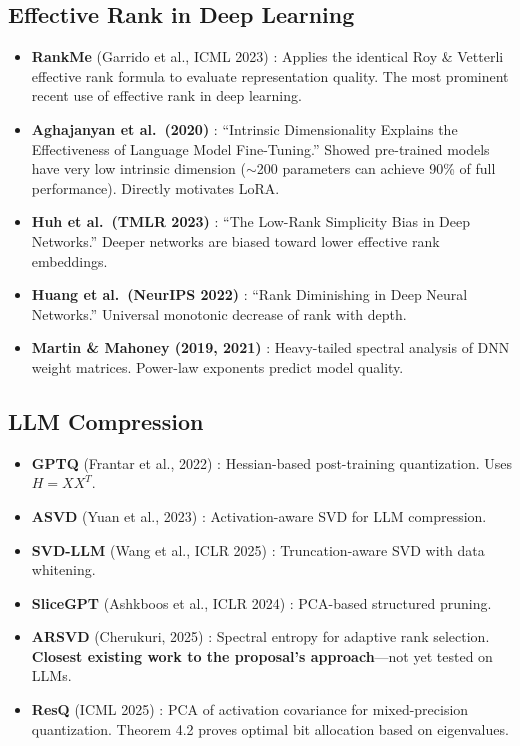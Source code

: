 \documentclass[11pt,a4paper]{article}
\begin{document}
\subsection{Effective Rank in Deep Learning}
\begin{itemize}
    \item \textbf{RankMe} (Garrido et al., ICML 2023) \cite{garrido2023rankme}: Applies the identical Roy \& Vetterli effective rank formula to evaluate representation quality. The most prominent recent use of effective rank in deep learning.
    \item \textbf{Aghajanyan et al.\ (2020)} \cite{aghajanyan2020intrinsic}: ``Intrinsic Dimensionality Explains the Effectiveness of Language Model Fine-Tuning.'' Showed pre-trained models have very low intrinsic dimension ($\sim$200 parameters can achieve 90\% of full performance). Directly motivates LoRA.
    \item \textbf{Huh et al.\ (TMLR 2023)} \cite{huh2023lowrank}: ``The Low-Rank Simplicity Bias in Deep Networks.'' Deeper networks are biased toward lower effective rank embeddings.
    \item \textbf{Huang et al.\ (NeurIPS 2022)} \cite{huang2022rank}: ``Rank Diminishing in Deep Neural Networks.'' Universal monotonic decrease of rank with depth.
    \item \textbf{Martin \& Mahoney (2019, 2021)} \cite{martin2019traditional, martin2021predicting}: Heavy-tailed spectral analysis of DNN weight matrices. Power-law exponents predict model quality.
\end{itemize}

\subsection{LLM Compression}
\begin{itemize}
    \item \textbf{GPTQ} (Frantar et al., 2022) \cite{frantar2022gptq}: Hessian-based post-training quantization. Uses $H = XX^T$.
    \item \textbf{ASVD} (Yuan et al., 2023) \cite{yuan2023asvd}: Activation-aware SVD for LLM compression.
    \item \textbf{SVD-LLM} (Wang et al., ICLR 2025) \cite{wang2024svdllm}: Truncation-aware SVD with data whitening.
    \item \textbf{SliceGPT} (Ashkboos et al., ICLR 2024) \cite{ashkboos2024slicegpt}: PCA-based structured pruning.
    \item \textbf{ARSVD} (Cherukuri, 2025) \cite{cherukuri2025arsvd}: Spectral entropy for adaptive rank selection. \textbf{Closest existing work to the proposal's approach}---not yet tested on LLMs.
    \item \textbf{ResQ} (ICML 2025) \cite{resq2025}: PCA of activation covariance for mixed-precision quantization. Theorem 4.2 proves optimal bit allocation based on eigenvalues.
\end{itemize}
\end{document}
